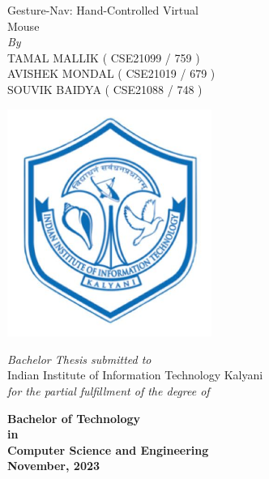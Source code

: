 

\clearpage
	\begin{titlepage}
    \centering
    {\Huge Gesture-Nav: Hand-Controlled Virtual \\ \vspace{0.4cm} Mouse\fontsize{24}{28.8}\selectfont {}\selectfont}\\
    
\vspace{\mySpace}
\vspace{0.1cm}
    \large \textit{By}\\
\vspace{\mySpace}
    {\Large TAMAL MALLIK ( CSE21099 / 759 ) \\
    \vspace{0.1cm}
    AVISHEK MONDAL ( CSE21019 / 679 ) \\
    \vspace{0.1cm}
    SOUVIK BAIDYA ( CSE21088  / 748 ) \\
    \fontsize{18}{22}\selectfont {}\selectfont
\vspace{\mySpace}}
    \begin{center}
        \includegraphics[width=0.5\textwidth]{iiitk_logo} %
    \end{center}
    {\Large \textit{Bachelor Thesis submitted to}\\
    \vspace{\mySpace}
    Indian Institute of Information Technology Kalyani \\ \vspace{\mySpace}
	 \textit{for the partial fulfillment of the degree of}\\ \vspace{\mySpace}

{\bfseries %
	 Bachelor of Technology \\
	 in \\
	 Computer Science and Engineering\\
\vspace{\mySpace}
	  November, 2023 \fontsize{18}{22}}\selectfont {}\selectfont}
    \vspace*{\fill}
\end{titlepage}